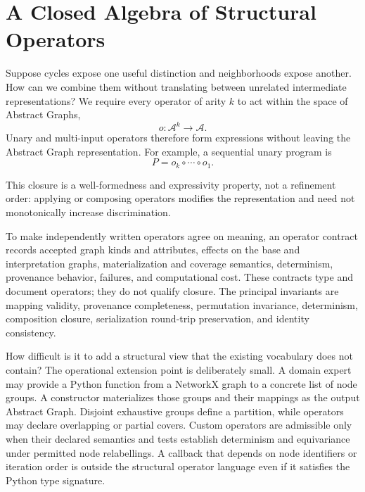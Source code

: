 \section{A Closed Algebra of Structural Operators}
\label{sec:operator-programs}

Suppose cycles expose one useful distinction and neighborhoods expose another.
How can we combine them without translating between unrelated intermediate
representations? We require every operator of arity $k$ to act within the
space of Abstract Graphs,
\begin{equation}
  o:\mathcal{A}^{k}\to\mathcal{A}.
\end{equation}
Unary and multi-input operators therefore form expressions without leaving
the Abstract Graph representation.
For example, a sequential unary program is
\begin{equation}
  P=o_k\circ\cdots\circ o_1.
\end{equation}

This closure is a well-formedness and expressivity property, not a refinement
order: applying or composing operators modifies the representation and need
not monotonically increase discrimination.

To make independently written operators agree on meaning, an operator contract
records accepted graph kinds and attributes, effects on
the base and interpretation graphs, materialization and coverage semantics,
determinism, provenance behavior, failures, and computational cost. These
contracts type and document operators; they do not qualify closure. The
principal invariants are mapping validity,
provenance completeness, permutation invariance, determinism, composition
closure, serialization round-trip preservation, and identity consistency.

How difficult is it to add a structural view that the existing vocabulary does
not contain? The operational extension point is deliberately small. A domain expert may
provide a Python function from a NetworkX graph to a concrete list of node
groups. A constructor materializes those groups and their mappings as the
output Abstract Graph. Disjoint exhaustive groups define a partition, while
operators may declare overlapping or partial covers. Custom operators are
admissible only when their declared semantics and tests establish determinism
and equivariance under permitted node relabellings. A callback that depends on
node identifiers or iteration order is outside the structural operator language
even if it satisfies the Python type signature.

